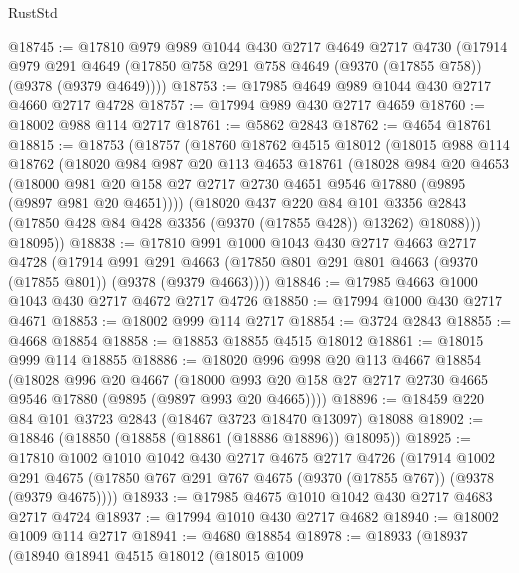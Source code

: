 \begin{lexlean}{RustStd}
\begin{coremodule}
@18745 := @17810
    @979
    @989
    @1044
    @430
    @2717
    @4649
    @2717
    @4730
    (@17914
      @979
      @291
      @4649
      (@17850 @758 @291 @758 @4649 (@9370 (@17855 @758)) (@9378 (@9379 @4649))))
@18753 := @17985 @4649 @989 @1044 @430 @2717 @4660 @2717 @4728
@18757 := @17994 @989 @430 @2717 @4659
@18760 := @18002 @988 @114 @2717
@18761 := @5862 @2843
@18762 := @4654 @18761
@18815 := @18753
    (@18757
      (@18760
        @18762
        @4515
        @18012
        (@18015
          @988
          @114
          @18762
          (@18020
            @984
            @987
            @20
            @113
            @4653
            @18761
            (@18028
              @984
              @20
              @4653
              (@18000
                @981
                @20
                @158
                @27
                @2717
                @2730
                @4651
                @9546
                @17880
                (@9895 (@9897 @981 @20 @4651))))
            (@18020
              @437
              @220
              @84
              @101
              @3356
              @2843
              (@17850 @428 @84 @428 @3356 (@9370 (@17855 @428)) @13262)
              @18088)))
        @18095))
@18838 := @17810
    @991
    @1000
    @1043
    @430
    @2717
    @4663
    @2717
    @4728
    (@17914
      @991
      @291
      @4663
      (@17850 @801 @291 @801 @4663 (@9370 (@17855 @801)) (@9378 (@9379 @4663))))
@18846 := @17985 @4663 @1000 @1043 @430 @2717 @4672 @2717 @4726
@18850 := @17994 @1000 @430 @2717 @4671
@18853 := @18002 @999 @114 @2717
@18854 := @3724 @2843
@18855 := @4668 @18854
@18858 := @18853 @18855 @4515 @18012
@18861 := @18015 @999 @114 @18855
@18886 := @18020
    @996
    @998
    @20
    @113
    @4667
    @18854
    (@18028
      @996
      @20
      @4667
      (@18000 @993 @20 @158 @27 @2717 @2730 @4665 @9546 @17880 (@9895 (@9897 @993 @20 @4665))))
@18896 := @18459 @220 @84 @101 @3723 @2843 (@18467 @3723 @18470 @13097) @18088
@18902 := @18846 (@18850 (@18858 (@18861 (@18886 @18896)) @18095))
@18925 := @17810
    @1002
    @1010
    @1042
    @430
    @2717
    @4675
    @2717
    @4726
    (@17914
      @1002
      @291
      @4675
      (@17850 @767 @291 @767 @4675 (@9370 (@17855 @767)) (@9378 (@9379 @4675))))
@18933 := @17985 @4675 @1010 @1042 @430 @2717 @4683 @2717 @4724
@18937 := @17994 @1010 @430 @2717 @4682
@18940 := @18002 @1009 @114 @2717
@18941 := @4680 @18854
@18978 := @18933
    (@18937
      (@18940
        @18941
        @4515
        @18012
        (@18015
          @1009

\end{coremodule}
\end{lexlean}
